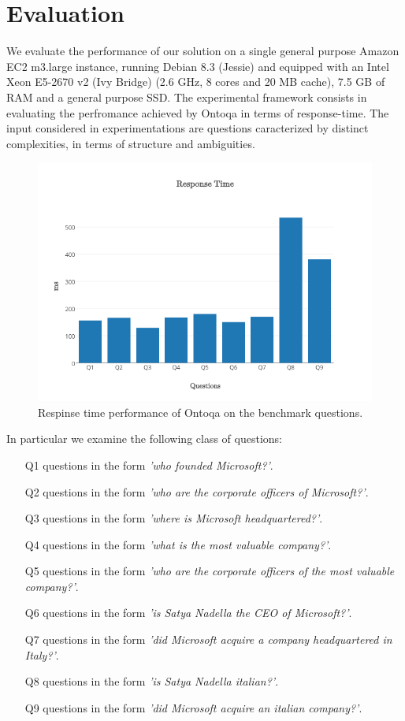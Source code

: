 \section{Evaluation}
\label{sec:evaluation}
We evaluate the performance of our solution on a single general purpose
Amazon EC2 m3.large instance, running Debian 8.3 (Jessie)
and equipped with an Intel Xeon E5-2670 v2 (Ivy Bridge)  (2.6 GHz,
8 cores and 20 MB cache), 7.5 GB of RAM and a general purpose SSD.
%
The experimental framework consists in evaluating the perfromance achieved by Ontoqa in terms of response-time.
%
The input considered in experimentations are questions caracterized by distinct complexities, in terms of structure and ambiguities.

\begin{figure}[H]
	\centering
	\includegraphics[width=0.8\columnwidth]{./fig/evaluation-response-time}
	\caption{Respinse time performance of Ontoqa on the benchmark questions.}
	\label{fig:evaluation-response-time}
\end{figure}

In particular we examine the following class of questions:

\begin{itemize}
	\item[Q1] questions in the form \textit{'who founded Microsoft?'}.
	\item[Q2] questions in the form \textit{'who are the corporate officers of Microsoft?'}.
	\item[Q3] questions in the form \textit{'where is Microsoft headquartered?'}.
	\item[Q4] questions in the form \textit{'what is the most valuable company?'}.
	\item[Q5] questions in the form \textit{'who are the corporate officers of the most valuable company?'}.
	\item[Q6] questions in the form \textit{'is Satya Nadella the CEO of Microsoft?'}.
	\item[Q7] questions in the form \textit{'did Microsoft acquire a company headquartered in Italy?'}.
	\item[Q8] questions in the form \textit{'is Satya Nadella italian?'}.
	\item[Q9] questions in the form \textit{'did Microsoft acquire an italian company?'}.
\end{itemize}

